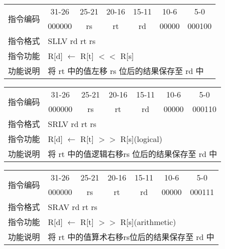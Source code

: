 	\begin{table}[!hbp]
		\centering
		\begin{tabular}{|c|c|c|c|c|c|c|}
		\hline
		\multirow{2}{*}{指令编码} & 31-26&25-21 & 20-16&15-11 &10-6 &5-0\\
		\cline{2-7} & 000000 & rs & rt & rd & 00000& 000100 \\
		\hline
		指令格式&\multicolumn{6}{|l|}{SLLV rd rt rs}\\
		\hline		
		指令功能&\multicolumn{6}{|l|}{R[d] $\leftarrow$  R[t] $<<$ R[s]}\\
		\hline		
		功能说明&\multicolumn{6}{|l|}{将 rt 中的值左移 rs 位后的结果保存至 rd 中}\\
		\hline
		\end{tabular}
	\end{table}
	\begin{table}[!hbp]
		\centering
		\begin{tabular}{|c|c|c|c|c|c|c|}
		\hline
		\multirow{2}{*}{指令编码} & 31-26&25-21 & 20-16&15-11 &10-6 &5-0\\
		\cline{2-7} & 000000 & rs & rt & rd & 00000& 000110 \\
		\hline
		指令格式&\multicolumn{6}{|l|}{SRLV rd rt rs}\\
		\hline		
		指令功能&\multicolumn{6}{|l|}{R[d] $\leftarrow$  R[t] $>>$ R[s](logical)}\\
		\hline		
		功能说明&\multicolumn{6}{|l|}{将 rt 中的值逻辑右移rs 位后的结果保存至 rd 中}\\
		\hline
		\end{tabular}
	\end{table}
	\begin{table}[!hbp]
		\centering
		\begin{tabular}{|c|c|c|c|c|c|c|}
		\hline
		\multirow{2}{*}{指令编码} & 31-26&25-21 & 20-16&15-11 &10-6 &5-0\\
		\cline{2-7} & 000000 & rs & rt & rd & 00000& 000111 \\
		\hline
		指令格式&\multicolumn{6}{|l|}{SRAV rd rt rs}\\
		\hline		
		指令功能&\multicolumn{6}{|l|}{R[d] $\leftarrow$  R[t] $>>$ R[s](arithmetic)}\\
		\hline		
		功能说明&\multicolumn{6}{|l|}{将 rt 中的值算术右移rs位后的结果保存至 rd 中}\\
		\hline
		\end{tabular}
	\end{table}
\newpage


